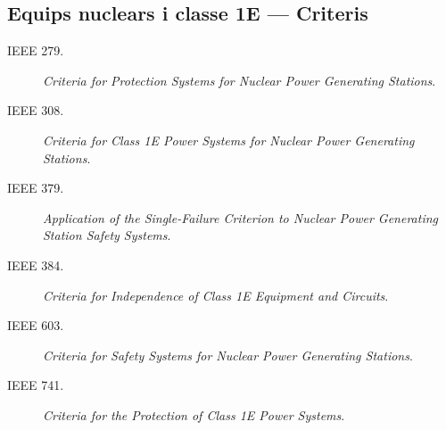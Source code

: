 \subsection*{Equips nuclears i classe 1E --- Criteris} 
\begin{description}
	\item [\hspace{5mm}IEEE 279.] \textit{Criteria for Protection Systems for Nuclear Power Generating Stations}.
	\item [\hspace{5mm}IEEE 308.] \textit{Criteria for Class 1E Power Systems for Nuclear Power Generating Stations}.
	\item [\hspace{5mm}IEEE 379.] \textit{Application of the Single-Failure Criterion to Nuclear Power Generating Station Safety Systems}.
	\item [\hspace{5mm}IEEE 384.] \textit{Criteria for Independence of Class 1E Equipment and Circuits}.
	\item [\hspace{5mm}IEEE 603.] \textit{Criteria for Safety Systems for Nuclear Power Generating Stations}.
	\item [\hspace{5mm}IEEE 741.] \textit{Criteria for the Protection of Class 1E Power Systems}.
\end{description}


